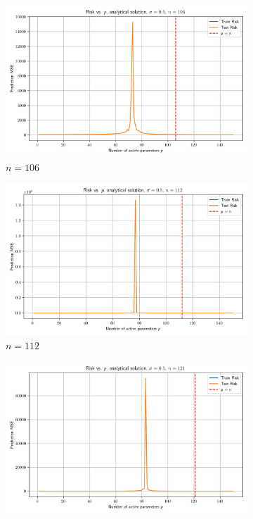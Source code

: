 \documentclass{article}
\begin{document}
\begin{figure}[htb]
  \begin{subfigure}[b]{\imgwidth}
    \includegraphics[width=\linewidth]{img2/risk_curve_n106.png}
    \caption{$n=106$}\label{fig:2i}
  \end{subfigure}%
  \hfill
  \begin{subfigure}[b]{\imgwidth}
    \includegraphics[width=\linewidth]{img2/risk_curve_n112.png}
    \caption{$n=112$}\label{fig:2j}
  \end{subfigure}%
  \hfill
  \begin{subfigure}[b]{\imgwidth}
    \includegraphics[width=\linewidth]{img2/risk_curve_n121.png}

\end{subfigure}
\end{figure}
\end{document}
